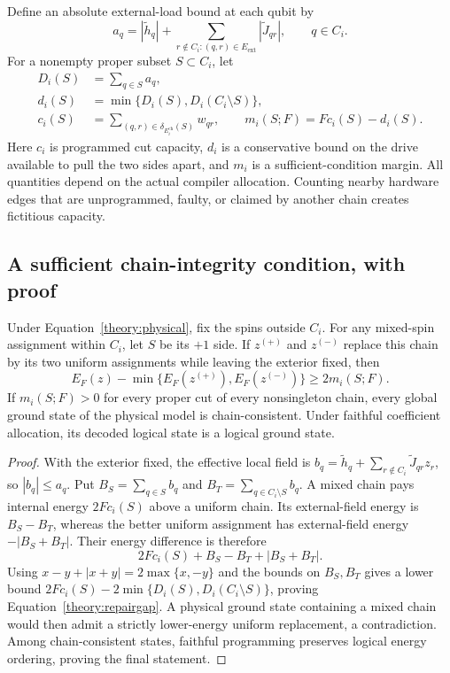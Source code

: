 Define an absolute external-load bound at each qubit by
\[
 a_q=|\widetilde h_q|+
       \sum_{r\notin C_i:(q,r)\in E_{\mathrm{ext}}}|\widetilde J_{qr}|,
 \qquad q\in C_i.
\]
For a nonempty proper subset $S\subset C_i$, let
\begin{align}
 D_i(S)&=\sum_{q\in S}a_q,\nonumber\\
 d_i(S)&=\min\{D_i(S),D_i(C_i\setminus S)\},\nonumber\\
 c_i(S)&=\sum_{(q,r)\in\delta_{E_i^{\mathrm{ch}}}(S)}w_{qr},
 \qquad
 m_i(S;F)=F c_i(S)-d_i(S).
 \label{theory:cutquantities}
\end{align}
Here $c_i$ is programmed cut capacity, $d_i$ is a conservative bound on the drive available to pull the two sides apart, and $m_i$ is a sufficient-condition margin. All quantities depend on the actual compiler allocation. Counting nearby hardware edges that are unprogrammed, faulty, or claimed by another chain creates fictitious capacity.

\subsection{A sufficient chain-integrity condition, with proof}
\label{theory:certificate}

\begin{proposition}
\label{theory:cutproposition}
Under Equation~\eqref{theory:physical}, fix the spins outside $C_i$. For any mixed-spin assignment within $C_i$, let $S$ be its $+1$ side. If $z^{(+)}$ and $z^{(-)}$ replace this chain by its two uniform assignments while leaving the exterior fixed, then
\begin{equation}
 E_F(z)-\min\{E_F(z^{(+)}),E_F(z^{(-)})\}
 \ge 2m_i(S;F).
 \label{theory:repairgap}
\end{equation}
If $m_i(S;F)>0$ for every proper cut of every nonsingleton chain, every global ground state of the physical model is chain-consistent. Under faithful coefficient allocation, its decoded logical state is a logical ground state.
\end{proposition}

\begin{proof}
With the exterior fixed, the effective local field is
$b_q=\widetilde h_q+\sum_{r\notin C_i}\widetilde J_{qr}z_r$, so $|b_q|\le a_q$. Put $B_S=\sum_{q\in S}b_q$ and $B_T=\sum_{q\in C_i\setminus S}b_q$. A mixed chain pays internal energy $2F c_i(S)$ above a uniform chain. Its external-field energy is $B_S-B_T$, whereas the better uniform assignment has external-field energy $-|B_S+B_T|$. Their energy difference is therefore
\[
 2F c_i(S)+B_S-B_T+|B_S+B_T|.
\]
Using $x-y+|x+y|=2\max\{x,-y\}$ and the bounds on $B_S,B_T$ gives a lower bound
$2F c_i(S)-2\min\{D_i(S),D_i(C_i\setminus S)\}$, proving Equation~\eqref{theory:repairgap}. A physical ground state containing a mixed chain would then admit a strictly lower-energy uniform replacement, a contradiction. Among chain-consistent states, faithful programming preserves logical energy ordering, proving the final statement.
\end{proof}

